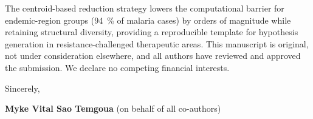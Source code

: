 \documentclass[10pt,letterpaper]{article}
\begin{document}
The centroid-based reduction strategy lowers the computational barrier for endemic-region groups (\qty{94}{\percent} of malaria cases) by orders of magnitude while retaining structural diversity, providing a reproducible template for hypothesis generation in resistance-challenged therapeutic areas. This manuscript is original, not under consideration elsewhere, and all authors have reviewed and approved the submission. We declare no competing financial interests.

\vspace{0.3em}

\noindent Sincerely,

\noindent \textbf{Myke Vital Sao Temgoua} (on behalf of all co-authors)
\end{document}
